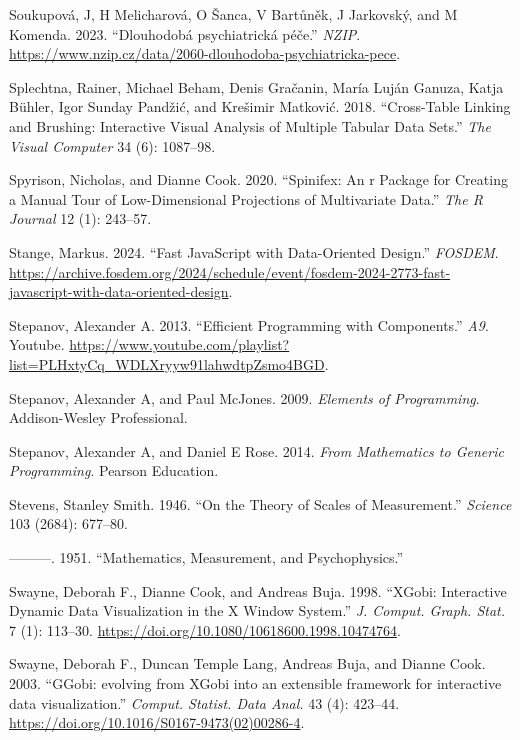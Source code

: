 \documentclass[
  openany]{book}
\newlength{\cslhangindent}
\newenvironment{CSLReferences}[2] %
 {\begin{list}{}{%
  \setlength{\itemindent}{0pt}
  \setlength{\leftmargin}{0pt}
  \setlength{\parsep}{0pt}
  \ifodd #1
   \setlength{\leftmargin}{\cslhangindent}
   \setlength{\itemindent}{-1\cslhangindent}
  \fi
  \setlength{\itemsep}{#2\baselineskip}}}
 {\end{list}}
\theoremstyle{definition}
\theoremstyle{definition}
\theoremstyle{definition}
\theoremstyle{definition}
\theoremstyle{remark}
\begin{document}
\begin{CSLReferences}{1}{0}
Soukupová, J, H Melicharová, O Šanca, V Bartůněk, J Jarkovský, and M Komenda. 2023. {``{Dlouhodobá psychiatrická péče}.''} \emph{NZIP}. \url{https://www.nzip.cz/data/2060-dlouhodoba-psychiatricka-pece}.

Splechtna, Rainer, Michael Beham, Denis Gračanin, María Luján Ganuza, Katja Bühler, Igor Sunday Pandžić, and Krešimir Matković. 2018. {``Cross-Table Linking and Brushing: Interactive Visual Analysis of Multiple Tabular Data Sets.''} \emph{The Visual Computer} 34 (6): 1087--98.

Spyrison, Nicholas, and Dianne Cook. 2020. {``Spinifex: An r Package for Creating a Manual Tour of Low-Dimensional Projections of Multivariate Data.''} \emph{The R Journal} 12 (1): 243--57.

Stange, Markus. 2024. {``Fast JavaScript with Data-Oriented Design.''} \emph{FOSDEM}. \url{https://archive.fosdem.org/2024/schedule/event/fosdem-2024-2773-fast-javascript-with-data-oriented-design}.

Stepanov, Alexander A. 2013. {``Efficient Programming with Components.''} \emph{A9}. Youtube. \url{https://www.youtube.com/playlist?list=PLHxtyCq_WDLXryyw91lahwdtpZsmo4BGD}.

Stepanov, Alexander A, and Paul McJones. 2009. \emph{Elements of Programming}. Addison-Wesley Professional.

Stepanov, Alexander A, and Daniel E Rose. 2014. \emph{From Mathematics to Generic Programming}. Pearson Education.

Stevens, Stanley Smith. 1946. {``On the Theory of Scales of Measurement.''} \emph{Science} 103 (2684): 677--80.

---------. 1951. {``Mathematics, Measurement, and Psychophysics.''}

Swayne, Deborah F., Dianne Cook, and Andreas Buja. 1998. {``{XGobi: Interactive Dynamic Data Visualization in the X Window System}.''} \emph{J. Comput. Graph. Stat.} 7 (1): 113--30. \url{https://doi.org/10.1080/10618600.1998.10474764}.

Swayne, Deborah F., Duncan Temple Lang, Andreas Buja, and Dianne Cook. 2003. {``{GGobi: evolving from XGobi into an extensible framework for interactive data visualization}.''} \emph{Comput. Statist. Data Anal.} 43 (4): 423--44. \url{https://doi.org/10.1016/S0167-9473(02)00286-4}.


\end{CSLReferences}
\end{document}
